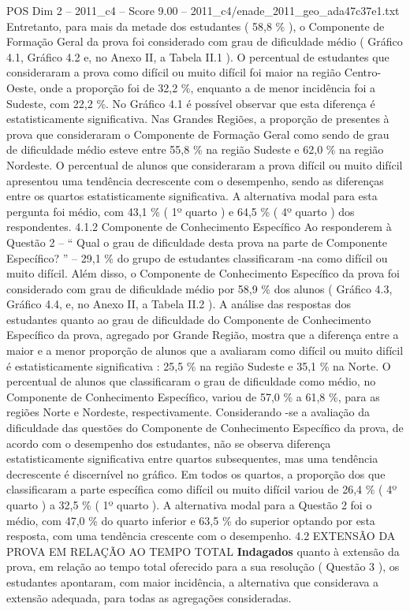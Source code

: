 \begin{textsample}{POS Dim 2 – 2011\_c4 – Score 9.00 – 2011\_c4/enade\_2011\_geo\_ada47c37e1.txt}
Entretanto, para mais da metade dos estudantes ( 58,8 \% ), o Componente de Formação Geral da prova foi considerado com grau de dificuldade médio ( Gráfico 4.1, Gráfico 4.2 e, no Anexo II, a Tabela II.1 ).
O percentual de estudantes que consideraram a prova como difícil ou muito difícil foi maior na região Centro-Oeste, onde a proporção foi de 32,2 \%, enquanto a de menor incidência foi a Sudeste, com 22,2 \%.
No Gráfico 4.1 é possível observar que esta diferença é estatisticamente significativa.
Nas Grandes Regiões, a proporção de presentes à prova que consideraram o Componente de Formação Geral como sendo de grau de dificuldade médio esteve entre 55,8 \% na região Sudeste e 62,0 \% na região Nordeste.
O percentual de alunos que consideraram a prova difícil ou muito difícil apresentou uma tendência decrescente com o desempenho, sendo as diferenças entre os quartos estatisticamente significativa.
A alternativa modal para esta pergunta foi médio, com 43,1 \% ( 1º quarto ) e 64,5 \% ( 4º quarto ) dos respondentes. 4.1.2 Componente de Conhecimento Específico Ao responderem à Questão 2 – “ Qual o grau de dificuldade desta prova na parte de Componente Específico? ” – 29,1 \% do grupo de estudantes classificaram -na como difícil ou muito difícil.
Além disso, o Componente de Conhecimento Específico da prova foi considerado com grau de dificuldade médio por 58,9 \% dos alunos ( Gráfico 4.3, Gráfico 4.4, e, no Anexo II, a Tabela II.2 ).
A análise das respostas dos estudantes quanto ao grau de dificuldade do Componente de Conhecimento Específico da prova, agregado por Grande Região, mostra que a diferença entre a maior e a menor proporção de alunos que a avaliaram como difícil ou muito difícil é estatisticamente significativa : 25,5 \% na região Sudeste e 35,1 \% na Norte.
O percentual de alunos que classificaram o grau de dificuldade como médio, no Componente de Conhecimento Específico, variou de 57,0 \% a 61,8 \%, para as regiões Norte e Nordeste, respectivamente.
Considerando -se a avaliação da dificuldade das questões do Componente de Conhecimento Específico da prova, de acordo com o desempenho dos estudantes, não se observa diferença estatisticamente significativa entre quartos subsequentes, mas uma tendência decrescente é discernível no gráfico.
Em todos os quartos, a proporção dos que classificaram a parte específica como difícil ou muito difícil variou de 26,4 \% ( 4º quarto ) a 32,5 \% ( 1º quarto ).
A alternativa modal para a Questão 2 foi o médio, com 47,0 \% do quarto inferior e 63,5 \% do superior optando por esta resposta, com uma tendência crescente com o desempenho. 4.2 EXTENSÃO DA PROVA EM RELAÇÃO AO TEMPO TOTAL \textbf{Indagados} quanto à extensão da prova, em relação ao tempo total oferecido para a sua resolução ( Questão 3 ), os estudantes apontaram, com maior incidência, a alternativa que considerava a extensão adequada, para todas as agregações consideradas.

\end{textsample}
